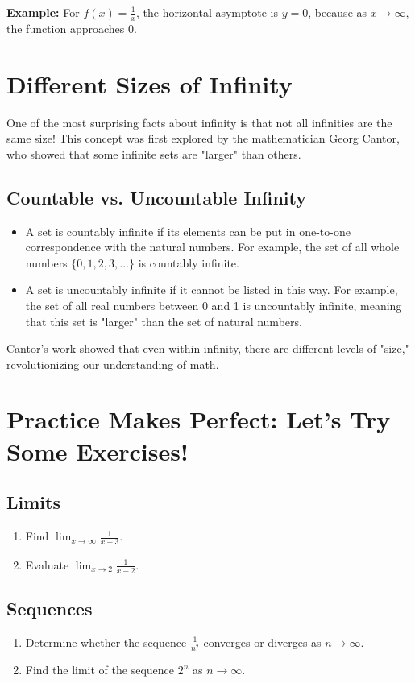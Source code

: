 \textbf{Example:} For $f(x) = \frac{1}{x}$, the horizontal asymptote is $y = 0$, because as $x \to \infty$, the function approaches 0.

\section{Different Sizes of Infinity}
One of the most surprising facts about infinity is that not all infinities are the same size! This concept was first explored by the mathematician Georg Cantor, who showed that some infinite sets are "larger" than others.

\subsection{Countable vs. Uncountable Infinity}
\begin{itemize}
    \item A set is countably infinite if its elements can be put in one-to-one correspondence with the natural numbers. For example, the set of all whole numbers $\{0, 1, 2, 3, \dots\}$ is countably infinite.
    \item A set is uncountably infinite if it cannot be listed in this way. For example, the set of all real numbers between 0 and 1 is uncountably infinite, meaning that this set is "larger" than the set of natural numbers.
\end{itemize}

Cantor’s work showed that even within infinity, there are different levels of "size," revolutionizing our understanding of math.

\section{Practice Makes Perfect: Let’s Try Some Exercises!}
\subsection{Limits}
\begin{enumerate}
    \item Find $\lim_{x \to \infty} \frac{1}{x+3}$.
    \item Evaluate $\lim_{x \to 2} \frac{1}{x-2}$.
\end{enumerate}

\subsection{Sequences}
\begin{enumerate}
    \item Determine whether the sequence $\frac{1}{n^2}$ converges or diverges as $n \to \infty$.
    \item Find the limit of the sequence $2^n$ as $n \to \infty$.
\end{enumerate}

